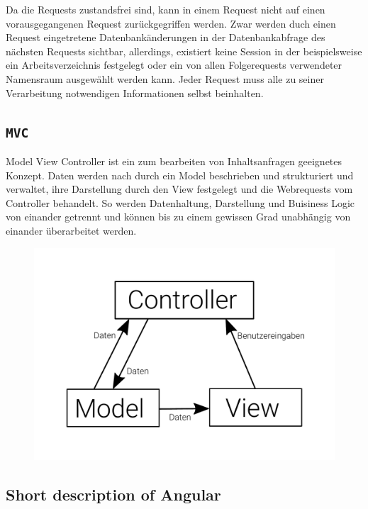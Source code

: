Da die Requests zustandsfrei sind, kann in einem Request nicht auf
einen vorausgegangenen Request zurückgegriffen werden. Zwar werden
duch einen Request eingetretene Datenbankänderungen in der
Datenbankabfrage des nächsten Requests sichtbar, allerdings, existiert
keine Session in der beispielsweise ein Arbeitsverzeichnis festgelegt
oder ein von allen Folgerequests verwendeter Namensraum ausgewählt
werden kann. Jeder Request muss alle zu seiner Verarbeitung
notwendigen Informationen selbst beinhalten.

\subsection{\texttt{MVC}}
Model View Controller ist ein zum bearbeiten von Inhaltsanfragen geeignetes
Konzept. Daten werden nach durch ein Model beschrieben und strukturiert und
verwaltet, ihre Darstellung durch den View festgelegt und die Webrequests vom
Controller behandelt. So werden Datenhaltung, Darstellung und Buisiness Logic
von einander getrennt und können bis zu einem gewissen Grad unabhängig von
einander überarbeitet werden.

\begin{figure}
  \centering
  \includegraphics[width=\columnwidth]{images/mvc.pdf}
\end{figure}

\subsection{Short description of Angular}

